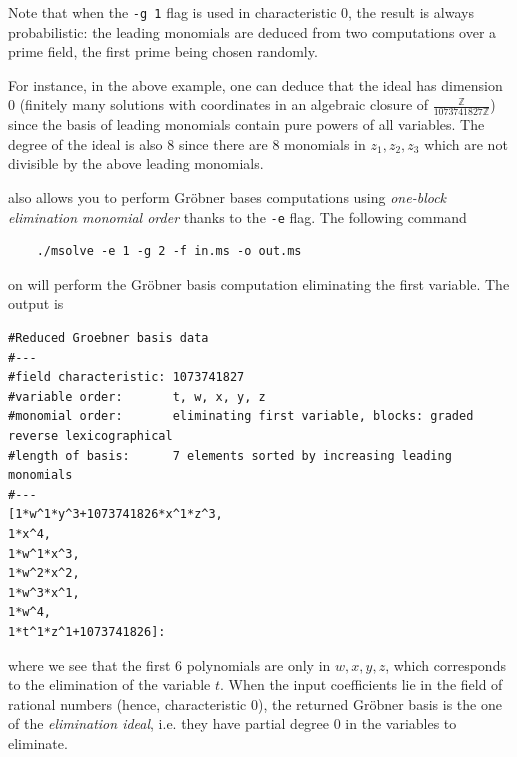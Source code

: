 \documentclass[a4paper,english,11pt]{scrartcl}
\theoremstyle{definition}
\theoremstyle{remark}
\begin{document}
Note that when the \verb+-g 1+ flag is used in characteristic $0$, the result is
always probabilistic: the leading monomials are deduced from two computations
over a prime field, the first prime being chosen randomly.

For instance, in the above example, one can deduce that the ideal has dimension
$0$ (finitely many solutions with coordinates in an algebraic closure of
$\frac{\mathbb{Z}}{1073741827\mathbb{Z}}$) since the basis of leading monomials
contain pure powers of all variables. The degree of the ideal is also $8$ since
there are $8$ monomials in $z_1, z_2, z_3$ which are not divisible by the above
leading monomials.

\msolve also allows you to perform Gr\"obner bases computations using
\emph{one-block elimination monomial order}
thanks to the \verb+-e+ flag. The following command
\begin{tcolorbox} %
  \begin{verbatim}
    ./msolve -e 1 -g 2 -f in.ms -o out.ms
  \end{verbatim}
\end{tcolorbox}
on
will perform the Gr\"obner basis computation eliminating the first
variable.
The output is
\begin{tcolorbox}
  \begin{lstlisting}
#Reduced Groebner basis data
#---
#field characteristic: 1073741827
#variable order:       t, w, x, y, z
#monomial order:       eliminating first variable, blocks: graded reverse lexicographical
#length of basis:      7 elements sorted by increasing leading monomials
#---
[1*w^1*y^3+1073741826*x^1*z^3,
1*x^4,
1*w^1*x^3,
1*w^2*x^2,
1*w^3*x^1,
1*w^4,
1*t^1*z^1+1073741826]:
  \end{lstlisting}
\end{tcolorbox}
where we see that the first $6$ polynomials are only in $w,x,y,z$,
which corresponds to the elimination of the variable $t$. When the input
coefficients lie in the field of rational numbers (hence, characteristic $0$),
the returned Gr\"obner basis is the one of the {\em elimination ideal}, i.e. they
have partial degree $0$ in the variables to eliminate.
\end{document}
